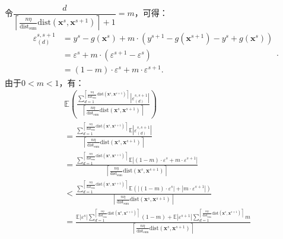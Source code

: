 \documentclass[12pt,a4paper]{article}%
\begin{document}
	令$\dfrac{d}{\left\lceil \frac{n\eta}{\text{dist}_{\text{sum}}}\text{dist}(\boldsymbol{x}^s,\boldsymbol{x}^{s+1})\right\rceil+1}=m$，可得：
	$$\begin{aligned}
		\varepsilon^{s,s+1}_{(d)}&=y^s-g(\boldsymbol{x}^s)+m\cdot(y^{s+1}-g(\boldsymbol{x}^{s+1})-y^s+g(\boldsymbol{x}^{s}))\\&=
		\varepsilon^s+m\cdot(\varepsilon^{s+1}-\varepsilon^s)\\&=
		(1-m)\cdot\varepsilon^s+m\cdot\varepsilon^{s+1}.
		\end{aligned}.$$
	由于$0<m<1$，有：\\
	$$\begin{aligned}
		&\mathbb{E}(\frac{\textstyle\sum_{d=1}^{{\left\lceil \frac{n\eta }{\text{dist}_{\text{sum}}}\text{dist}(\boldsymbol{x}^s,\boldsymbol{x}^{s+1})\right\rceil}}{|\varepsilon^{s,s+1}_{(d)}|}}{\left\lceil \frac{n\eta }{\text{dist}_{\text{sum}}}\text{dist}(\boldsymbol{x}^s,\boldsymbol{x}^{s+1})\right\rceil})\\&=
		\frac{\textstyle\sum_{d=1}^{{\left\lceil \frac{n\eta }{\text{dist}_{\text{sum}}}\text{dist}(\boldsymbol{x}^s,\boldsymbol{x}^{s+1})\right\rceil}}{
		\mathbb{E}|\varepsilon^{s,s+1}_{(d)}|}}{\left\lceil \frac{n\eta }{\text{dist}_{\text{sum}}}\text{dist}(\boldsymbol{x}^s,\boldsymbol{x}^{s+1})\right\rceil}\\&=
		\frac{\textstyle\sum_{d=1}^{{\left\lceil \frac{n\eta }{\text{dist}_{\text{sum}}}\text{dist}(\boldsymbol{x}^s,\boldsymbol{x}^{s+1})\right\rceil}}{
		\mathbb{E}|(1-m)\cdot\varepsilon^s+m\cdot\varepsilon^{s+1}|}}{\left\lceil \frac{n\eta }{\text{dist}_{\text{sum}}}\text{dist}(\boldsymbol{x}^s,\boldsymbol{x}^{s+1})\right\rceil}\\&<
		\frac{\textstyle\sum_{d=1}^{{\left\lceil \frac{n\eta }{\text{dist}_{\text{sum}}}\text{dist}(\boldsymbol{x}^s,\boldsymbol{x}^{s+1})\right\rceil}}{
		\mathbb{E}(|(1-m)\cdot\varepsilon^s|+|m\cdot\varepsilon^{s+1}|)}}{\left\lceil \frac{n\eta }{\text{dist}_{\text{sum}}}\text{dist}(\boldsymbol{x}^s,\boldsymbol{x}^{s+1})\right\rceil}\\&=
		\frac{\mathbb{E}|\varepsilon^s|\textstyle\sum_{d=1}^{{\left\lceil \frac{n\eta }{\text{dist}_{\text{sum}}}\text{dist}(\boldsymbol{x}^s,\boldsymbol{x}^{s+1})\right\rceil}}{
		(1-m)+\mathbb{E}|\varepsilon^{s+1}|}\textstyle\sum_{d=1}^{\left\lceil \frac{n\eta}{\text{dist}_{\text{sum}}}\text{dist}(\boldsymbol{x}^s,\boldsymbol{x}^{s+1})\right\rceil}m}{\left\lceil \frac{n\eta }{\text{dist}_{\text{sum}}}\text{dist}(\boldsymbol{x}^s,\boldsymbol{x}^{s+1})\right\rceil}\\

\end{aligned}$$
\end{document}
